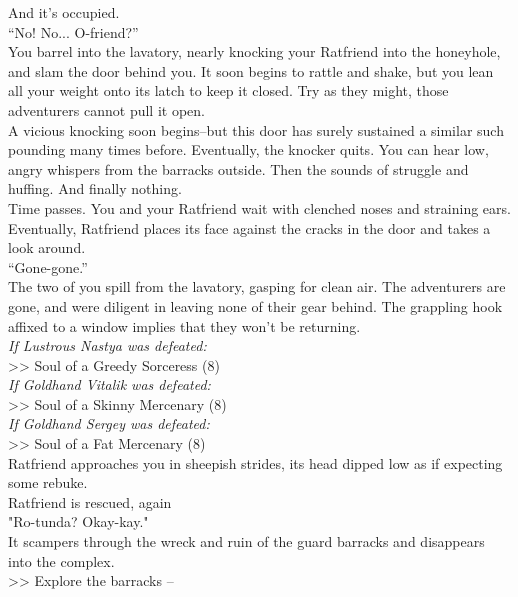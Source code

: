 And it’s occupied.\\

“No! No... O-friend?”\\

You barrel into the lavatory, nearly knocking your Ratfriend into the honeyhole, and slam the door behind you. It soon begins to rattle and shake, but you lean all your weight onto its latch to keep it closed. Try as they might, those adventurers cannot pull it open.\\

A vicious knocking soon begins--but this door has surely sustained a similar such pounding many times before. Eventually, the knocker quits. You can hear low, angry whispers from the barracks outside. Then the sounds of struggle and huffing. And finally nothing.\\

Time passes. You and your Ratfriend wait with clenched noses and straining ears. Eventually, Ratfriend places its face against the cracks in the door and takes a look around.\\

“Gone-gone.”\\

The two of you spill from the lavatory, gasping for clean air. The adventurers are gone, and were diligent in leaving none of their gear behind. The grappling hook affixed to a window implies that they won't be returning.\\

\emph{If Lustrous Nastya was defeated:}\\
>> Soul of a Greedy Sorceress (8)\\

\emph{If Goldhand Vitalik was defeated:}\\
>> Soul of a Skinny Mercenary (8)\\

\emph{If Goldhand Sergey was defeated:}\\
>> Soul of a Fat Mercenary (8)\\

Ratfriend approaches you in sheepish strides, its head dipped low as if expecting some rebuke.\\
 Ratfriend is rescued, again\\

"Ro-tunda? Okay-kay."\\

It scampers through the wreck and ruin of the guard barracks and disappears into the complex.\\

>> Explore the barracks -- 